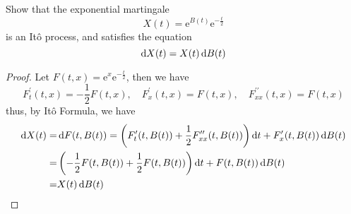 \begin{example}
	Show that the exponential martingale
	\begin{equation*}
		X(t)=\mathrm{e}^{B(t)}\mathrm{e}^{-\frac{t}{2}}
	\end{equation*}
	is an It\^o process, and satisfies the equation
	\begin{equation*}
		\mathop{}\!\mathrm{d} X(t)=X(t)\mathop{}\!\mathrm{d} B(t)
	\end{equation*}
\end{example}
\begin{proof}
	Let $F(t,x)=\mathrm{e}^{x}\mathrm{e}^{-\frac{t}{2}}$, then we have
	\begin{equation*}
		F_{t}^{\prime}(t,x)=-\frac{1}{2}F(t,x),\quad F_{x}^{\prime}(t,x)=F(t,x),\quad F_{xx}^{\prime\prime}(t,x)=F(t,x)
	\end{equation*}
	thus, by It\^o Formula, we have
	\begin{equation*}
		\begin{aligned}
			\mathop{}\!\mathrm{d} X(t)= & \mathop{}\!\mathrm{d} F(t,B(t))=\left(F_{t}^{\prime}(t,B(t))+\frac{1}{2}F_{xx}^{\prime\prime}(t,B(t))\right)\mathop{}\!\mathrm{d} t+F_{x}^{\prime}(t,B(t))\mathop{}\!\mathrm{d} B(t) \\
			=          & \left(-\frac{1}{2}F(t,B(t))+\frac{1}{2}F(t,B(t))\right)\mathop{}\!\mathrm{d} t+F(t,B(t))\mathop{}\!\mathrm{d} B(t)                                                  \\
			=          & X(t)\mathop{}\!\mathrm{d} B(t)
		\end{aligned}
	\end{equation*}
\end{proof}

\begin{example}

\end{example}

\begin{example}

\end{example}
